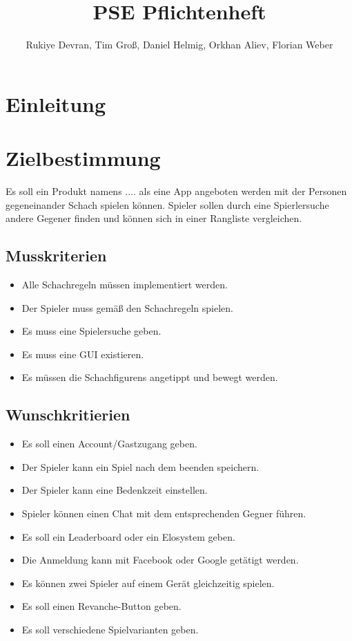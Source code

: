 \documentclass[parskip=full]{scrartcl}
\title{PSE Pflichtenheft}
\author{Rukiye Devran, Tim Groß, Daniel Helmig, Orkhan Aliev, Florian Weber}
\begin{document}
	\begin{titlepage}
	\maketitle	
	\tableofcontents
	
	\end{titlepage}
\section{Einleitung}
\section{Zielbestimmung}
Es soll ein Produkt namens .... als eine App angeboten werden mit der Personen gegeneinander Schach spielen können. Spieler sollen durch eine Spierlersuche andere Gegener finden und können sich in einer Rangliste vergleichen. 
\subsection{Musskriterien}
\begin{itemize}[nosep]
\item Alle \gls{Schachregeln} müssen implementiert werden.
\item Der \gls{Spieler} muss gemäß den \gls{Schachregeln} spielen.
\item Es muss eine Spielersuche geben.
\item Es muss eine GUI existieren.
\item Es müssen die \glspl{Schachfiguren} angetippt und bewegt werden.
\end{itemize}
\subsection{Wunschkritierien}
\begin{itemize}[nosep]
\item Es soll einen Account/Gastzugang geben.
\item Der \gls{Spieler} kann ein Spiel nach dem beenden speichern.
\item Der \gls{Spieler} kann eine Bedenkzeit einstellen.
\item \gls{Spieler} können einen Chat mit dem entsprechenden Gegner führen.
\item Es soll ein Leaderboard oder ein Elosystem geben.
\item Die Anmeldung kann mit Facebook oder Google getätigt werden.
\item Es können zwei \gls{Spieler} auf einem Gerät gleichzeitig spielen.
\item Es soll einen Revanche-Button geben.
\item Es soll verschiedene Spielvarianten geben.
\end{itemize}
\end{document}
